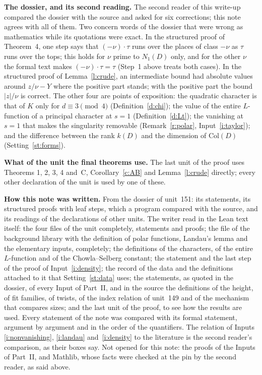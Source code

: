 \documentclass[11pt,a4paper]{article}
\newcommand{\subhead}[1]{\par\addvspace{9pt plus 2pt}\Needspace{4\baselineskip}\noindent\textbf{#1}\enspace\ignorespaces}
\theoremstyle{plainx}
\theoremstyle{uprightx}
\newcommand{\Col}[1]{\mathrm{Col}(#1)}
\newcounter{inp}
\begin{document}
\subhead{The dossier, and its second reading.} The second reader of this write-up compared the dossier with the
source and asked for six corrections; this note agrees with all of them. Two concern words of the dossier that
were wrong as mathematics while its quotations were exact. In the structured proof of Theorem~4, one step says
that $(-\nu)\cdot\tau$ runs over the places of class $-\nu$ as $\tau$ runs over the tops; this holds for $\nu$ prime to
$N_1(D)$ only, and for the other $\nu$ the formal text makes $(-\nu)\cdot\tau=\tau$ (Step~1 above treats both cases).
In the structured proof of Lemma~\ref{l:crude}, an intermediate bound had absolute values around $z/\nu-Y$ where the
positive part stands; with the positive part the bound $|z|/\nu$ is correct. The other four are points of
exposition: the quadratic character is that of $K$ only for $d\equiv3\pmod 4$ (Definition~\ref{d:chi}); the value of
the entire $L$-function of a principal character at $s=1$ (Definition~\ref{d:Lt}); the vanishing at $s=1$ that makes
the singularity removable (Remark~\ref{r:polar}, Input~\ref{i:taylor}); and the difference between the rank $k(D)$
and the dimension of $\Col{D}$ (Setting~\ref{st:forms}).

\subhead{What of the unit the final theorems use.} The last unit of the proof uses Theorems 1, 2, 3, 4 and~C,
Corollary~\ref{c:AB} and Lemma~\ref{l:crude} directly; every other declaration of the unit is used by one of these.

\subhead{How this note was written.} From the dossier of unit~151: its statements, its \UnitProofs{} structured
proofs with \UnitSteps{} leaf steps, which a program compared with the source, and its readings of the declarations
of other units. The writer read in the Lean text itself: the four files of the unit completely, statements and
proofs; the file of the background library with the definition of polar functions, Landau's lemma and the
elementary inputs, completely; the definitions of the characters, of the entire $L$-function and of the
Chowla--Selberg constant; the statement and the last step of the proof of Input~\ref{i:density}; the record of the
data and the definitions attached to it that Setting~\ref{st:data} uses; the statements, as quoted in the dossier, of
every Input of Part~II, and in the source the definitions of the height, of fit families, of twists, of the index
relation of unit~149 and of the mechanism that compares sizes; and the last unit of the proof, to see how the
results are used. Every statement of the note was compared with its formal statement, argument by argument and in
the order of the quantifiers. The relation of Inputs \ref{i:nonvanishing}, \ref{i:landau} and~\ref{i:density} to the
literature is the second reader's comparison, as their boxes say. Not opened for this note: the proofs of the
Inputs of Part~II, and Mathlib, whose facts were checked at the pin by the second reader, as said above.
\end{document}
